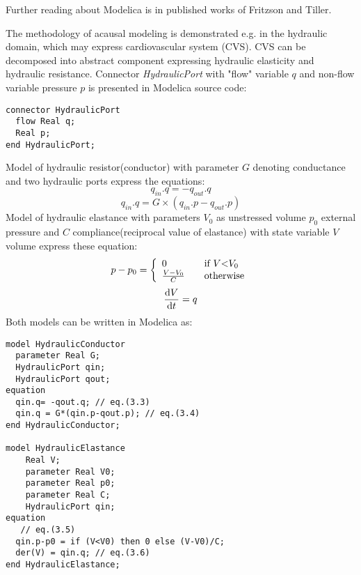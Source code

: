\documentclass[letterpaper, 10 pt, conference]{ieeeconf}  %
\begin{document}
Further reading about Modelica is in published works of Fritzson \cite{fritzson2010} and Tiller\cite{Tiller2014}.

The methodology of acausal modeling is demonstrated e.g. in the hydraulic domain, which may express cardiovascular system (CVS). CVS can be decomposed into abstract component expressing hydraulic elasticity and hydraulic resistance. Connector \emph{HydraulicPort} with "flow" variable $q$ and non-flow variable pressure $p$ is presented in Modelica source code:
\begin{lstlisting}[language=modelica]
connector HydraulicPort
  flow Real q;
  Real p;
end HydraulicPort;
\end{lstlisting}
Model of hydraulic resistor(conductor) with parameter $G$ denoting conductance and two hydraulic ports express the equations:
\begin{equation}
q_{in}.q = -q_{out}.q \label{eq:conductor1}
\end{equation} 
\begin{equation}
 q_{in}.q = G \times (q_{in}.p-q_{out}.p) \label{eq:conductor2}
\end{equation}
Model of hydraulic elastance with parameters $V_0$ as unstressed volume $p_0$ external pressure and $C$ compliance(reciprocal value of elastance) with state variable $V$ volume express these equation:
\begin{equation} \label{eq:elastic1}p-p_0 = \left\{   
  \begin{array}{l l} 0 & \quad \text{if } V \text{\textless} V_0 \\ 
    \frac{V-V_0}{C} & \quad \text{otherwise}
  \end{array} \right.\end{equation} 
\begin{equation}\label{eq:elastic2}\frac{{\rm d}V}{{\rm d}t} =  q\end{equation} 
Both models can be written in Modelica as:
\begin{lstlisting}[language=modelica]
model HydraulicConductor
  parameter Real G;
  HydraulicPort qin;
  HydraulicPort qout;
equation 
  qin.q= -qout.q; // eq.(3.3)
  qin.q = G*(qin.p-qout.p); // eq.(3.4)
end HydraulicConductor;

model HydraulicElastance
    Real V;
    parameter Real V0;
    parameter Real p0;
    parameter Real C;
    HydraulicPort qin;
equation 
   // eq.(3.5)
  qin.p-p0 = if (V<V0) then 0 else (V-V0)/C;
  der(V) = qin.q; // eq.(3.6)
end HydraulicElastance;
\end{lstlisting}
\end{document}
